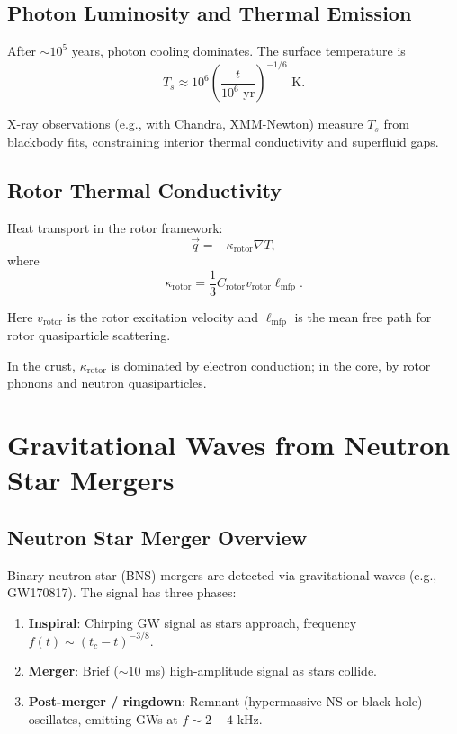 \documentclass[12pt,a4paper]{article}
\theoremstyle{definition}
\theoremstyle{remark}
\begin{document}
\subsection{Photon Luminosity and Thermal Emission}

After $\sim 10^5$ years, photon cooling dominates. The surface temperature is
\begin{equation}
T_s \approx 10^6 \left(\frac{t}{10^6 \text{ yr}}\right)^{-1/6} \text{ K}.
\end{equation}

X-ray observations (e.g., with Chandra, XMM-Newton) measure $T_s$ from blackbody fits, constraining interior thermal conductivity and superfluid gaps.

\subsection{Rotor Thermal Conductivity}

Heat transport in the rotor framework:
\begin{equation}
\vec{q} = -\kappa_{\text{rotor}} \nabla T,
\end{equation}
where
\begin{equation}
\kappa_{\text{rotor}} = \frac{1}{3} C_{\text{rotor}} v_{\text{rotor}} \ell_{\text{mfp}}.
\end{equation}

Here $v_{\text{rotor}}$ is the rotor excitation velocity and $\ell_{\text{mfp}}$ is the mean free path for rotor quasiparticle scattering.

In the crust, $\kappa_{\text{rotor}}$ is dominated by electron conduction; in the core, by rotor phonons and neutron quasiparticles.

\section{Gravitational Waves from Neutron Star Mergers}

\subsection{Neutron Star Merger Overview}

Binary neutron star (BNS) mergers are detected via gravitational waves (e.g., GW170817). The signal has three phases:

\begin{enumerate}
\item \textbf{Inspiral}: Chirping GW signal as stars approach, frequency $f(t) \sim (t_c - t)^{-3/8}$.
\item \textbf{Merger}: Brief ($\sim 10$ ms) high-amplitude signal as stars collide.
\item \textbf{Post-merger / ringdown}: Remnant (hypermassive NS or black hole) oscillates, emitting GWs at $f \sim 2-4$ kHz.
\end{enumerate}
\end{document}
